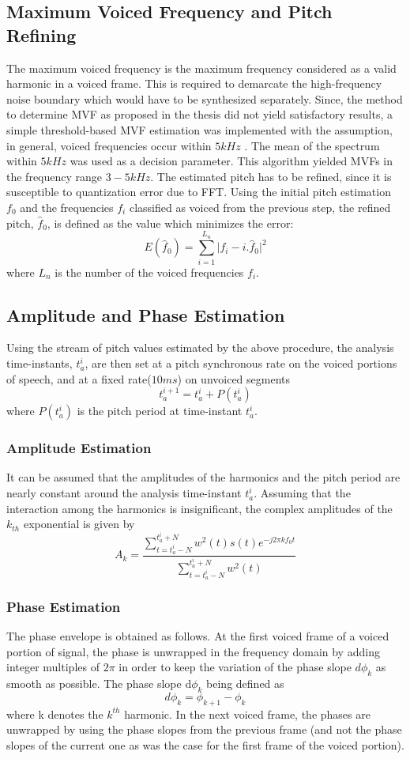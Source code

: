 \documentclass[BTech]{nitkdiss}
\begin{document}
\subsection{Maximum Voiced Frequency and Pitch Refining}
 The maximum voiced frequency is the maximum frequency considered as a valid harmonic in a voiced frame. This is required to demarcate the high-frequency noise boundary which would have to be synthesized separately. Since, the method to determine MVF as proposed in the thesis did not yield satisfactory results, a simple threshold-based MVF estimation was implemented with the assumption, in general, voiced frequencies occur within $5kHz$ . The mean of the spectrum within $5 kHz$ was used as a decision parameter. This algorithm yielded MVFs in the frequency range $3-5 kHz$.
The estimated pitch has to be refined, since it is susceptible to quantization error due to FFT. Using the initial pitch estimation $f_{0}$ and the frequencies $f_{i}$ classified as voiced from the previous step, the refined pitch, $\hat{f}_{0}$, is defined as the value which minimizes the error: $$E(\hat{f}_{0})=\sum_{i=1}^{L_{n}}\lvert f_{i}-i.\hat{f}_{0} \rvert^{2}$$ where $L_{n}$ is the number of the voiced frequencies $f_{i}$.


\subsection {Amplitude and Phase Estimation}
Using the stream of pitch values estimated by the above procedure, the analysis time-instants, $t_{a}^{i}$, are then set at a pitch synchronous rate on the voiced portions of speech, and at a fixed rate($10ms$) on unvoiced segments $$t_{a}^{i+1} = t_{a}^{i} + P(t_{a}^{i})$$ where $P(t_{a}^{i})$ is the pitch period at time-instant $t_{a}^{i}$.

\subsubsection{Amplitude Estimation}
It can be assumed that the amplitudes of the harmonics and the pitch period are nearly constant around the analysis time-instant $t_{a}^{i}$. Assuming that the interaction among the harmonics is insignificant, the complex amplitudes of the $k_{th}$ exponential is given by $$A_{k} = \dfrac {\sum_{t=t_{a}^{i}-N}^{t_{a}^{i}+N}w^{2}(t)s(t)e^{-j2\pi kf_{0}t}}{\sum_{t=t_{a}^{i}-N}^{t_{a}^{i}+N}w^{2}(t)}$$

\subsubsection{Phase Estimation}
The phase envelope is obtained as follows. At the first voiced frame of a voiced portion of signal, the phase is unwrapped in the frequency domain by adding integer multiples of $2\pi$ in order to keep the variation of the phase slope $d\phi_{k}$ as smooth as possible. The phase slope d$\phi_{k}$ being defined as $$d\phi_{k} = \phi_{k+1} - \phi_{k}$$ where k denotes the $k^{th}$ harmonic. 
In the next voiced frame, the phases are unwrapped by using the phase slopes from the previous frame (and not the phase slopes of the current one as was the case for the first frame of the voiced portion).
\end{document}
